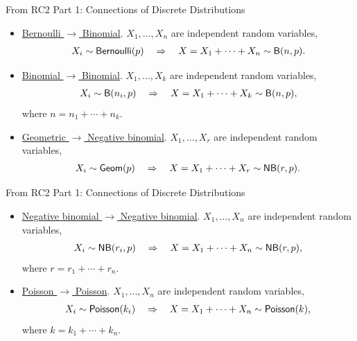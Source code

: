 \begin{frame}{From RC2 Part 1: Connections of Discrete Distributions}

\begin{itemize}
	\justifying
	\item \underline{Bernoulli $\rightarrow$ Binomial}. $X_1, \ldots, X_n$ are independent random variables,
	\begin{align*}
	X_i\sim \mathsf{Bernoulli}(p) \quad \Rightarrow \quad X = X_1 + \cdots + X_n \sim \mathsf{B}(n, p).
	\end{align*}
	\item \underline{Binomial $\rightarrow$ Binomial}. $X_1, \ldots, X_k$ are independent random variables,
	\begin{align*}
	X_i\sim \mathsf{B}(n_i, p) \quad \Rightarrow\quad X = X_1 + \cdots + X_k \sim \mathsf{B}(n, p),
	\end{align*}
	where $n = n_1 + \cdots + n_k$.
	\item \underline{Geometric $\rightarrow$ Negative binomial}. $X_1, \ldots, X_r$ are independent random variables,
	\begin{align*}
	X_i\sim \mathsf{Geom}(p) \quad \Rightarrow \quad X = X_1 + \cdots + X_r \sim \mathsf{NB}(r, p).
	\end{align*}
\end{itemize}

\end{frame}


\begin{frame}{From RC2 Part 1: Connections of Discrete Distributions}

\begin{itemize}
\justifying
\item \underline{Negative binomial $\rightarrow$ Negative binomial}. $X_1, \ldots, X_n$ are independent random variables,
\begin{align*}
X_i\sim \mathsf{NB}(r_i, p) \quad \Rightarrow \quad X = X_1 + \cdots + X_n \sim \mathsf{NB}(r, p),
\end{align*}
where $r = r_1 + \cdots + r_n$.
\item \underline{Poisson $\rightarrow$ Poisson}. $X_1, \ldots, X_n$ are independent random variables,
\begin{align*}
X_i\sim \mathsf{Poisson}(k_i) \quad \Rightarrow \quad X = X_1 + \cdots + X_n \sim \mathsf{Poisson}(k),
\end{align*}
where $k = k_1 + \cdots + k_n$.
\end{itemize}
~\\


\end{frame}




